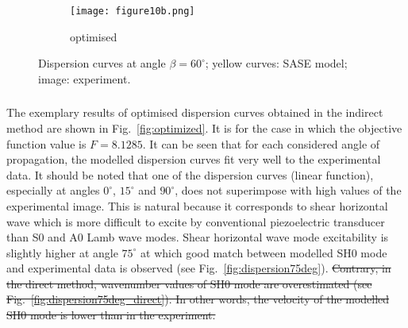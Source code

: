 \documentclass[preprint,12pt]{elsarticle}
\providecommand{\DIFaddtex}[1]{{\protect\color{blue}\uwave{#1}}} %
\providecommand{\DIFdeltex}[1]{{\protect\color{red}\sout{#1}}}                      %
\providecommand{\DIFaddbegin}{} %
\providecommand{\DIFaddend}{} %
\providecommand{\DIFdelbegin}{} %
\providecommand{\DIFdelend}{} %
\providecommand{\DIFaddbeginFL}{} %
\providecommand{\DIFaddendFL}{} %
\providecommand{\DIFdelbeginFL}{} %
\providecommand{\DIFdelendFL}{} %
\providecommand{\DIFadd}[1]{\texorpdfstring{\DIFaddtex{#1}}{#1}} %
\providecommand{\DIFdel}[1]{\texorpdfstring{\DIFdeltex{#1}}{}} %
\begin{document}
\begin{figure} [h!]
\DIFdelendFL \DIFaddbeginFL \begin{subfigure}[b]{0.49\textwidth}
			\DIFaddendFL \centering
			\DIFdelbeginFL %
\DIFdelendFL \DIFaddbeginFL \texttt{[image: figure10b.png]}
			\DIFaddendFL \caption{optimised}
			\label{fig:dispersion60deg}
		\end{subfigure}
	\caption{Dispersion curves at angle $\beta = 60^{\circ}$; yellow curves: SASE model; image: experiment. }
	\label{fig:initial_optimized}
	\end{figure}
\DIFdelbegin %

\DIFdelend \DIFaddbegin \subsubsection{\DIFadd{Indirect method}}
\DIFaddend The exemplary results of optimised dispersion curves obtained in the indirect method are shown in Fig.~\ref{fig:optimized}. It is for the case in which the objective function value is \DIFdelbegin \DIFdel{$F=8.1285$}\DIFdelend \DIFaddbegin \DIFadd{$F=29.5845$}\DIFaddend . It can be seen that for each considered angle of propagation, the modelled dispersion curves fit very well to the experimental data. It should be noted that one of the dispersion curves (linear function), especially at angles $0^{\circ}$, $15^{\circ}$ and $90^{\circ}$, does not superimpose with high values of the experimental image. This is natural because it corresponds to shear horizontal wave which is more difficult to excite by conventional piezoelectric transducer than S0 and A0 Lamb wave modes. Shear horizontal wave mode excitability is slightly higher at angle $75^{\circ}$ at which good match between modelled SH0 mode and experimental data is observed (see Fig.~\ref{fig:dispersion75deg}). 
\DIFdelbegin \DIFdel{Contrary, in the direct method, wavenumber values of SH0 mode are overestimated (see Fig.~\ref{fig:dispersion75deg_direct}). In other words, the velocity of the modelled SH0 mode is lower than in the experiment.
}\DIFdelend 
\end{document}
